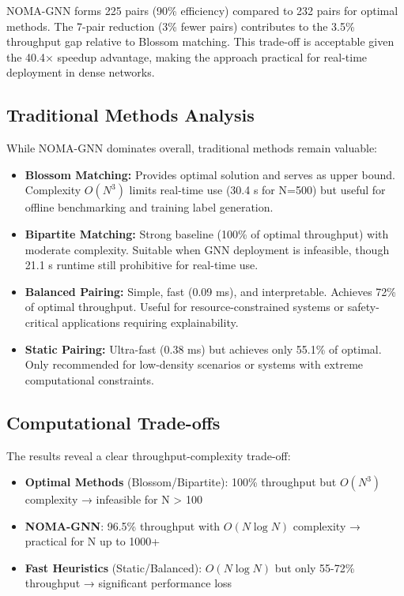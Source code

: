 NOMA-GNN forms 225 pairs (90\% efficiency) compared to 232 pairs for optimal methods. The 7-pair reduction (3\% fewer pairs) contributes to the 3.5\% throughput gap relative to Blossom matching. This trade-off is acceptable given the 40.4× speedup advantage, making the approach practical for real-time deployment in dense networks.

\subsection{Traditional Methods Analysis}

While NOMA-GNN dominates overall, traditional methods remain valuable:

\begin{itemize}
    \item \textbf{Blossom Matching:} Provides optimal solution and serves as upper bound. Complexity $O(N^3)$ limits real-time use (30.4 s for N=500) but useful for offline benchmarking and training label generation.
    
    \item \textbf{Bipartite Matching:} Strong baseline (100\% of optimal throughput) with moderate complexity. Suitable when GNN deployment is infeasible, though 21.1 s runtime still prohibitive for real-time use.
    
    \item \textbf{Balanced Pairing:} Simple, fast (0.09 ms), and interpretable. Achieves 72\% of optimal throughput. Useful for resource-constrained systems or safety-critical applications requiring explainability.
    
    \item \textbf{Static Pairing:} Ultra-fast (0.38 ms) but achieves only 55.1\% of optimal. Only recommended for low-density scenarios or systems with extreme computational constraints.
\end{itemize}

\subsection{Computational Trade-offs}

The results reveal a clear throughput-complexity trade-off:

\begin{itemize}
    \item \textbf{Optimal Methods} (Blossom/Bipartite): 100\% throughput but $O(N^3)$ complexity → infeasible for N > 100
    \item \textbf{NOMA-GNN}: 96.5\% throughput with $O(N \log N)$ complexity → practical for N up to 1000+
    \item \textbf{Fast Heuristics} (Static/Balanced): $O(N \log N)$ but only 55-72\% throughput → significant performance loss
\end{itemize}

